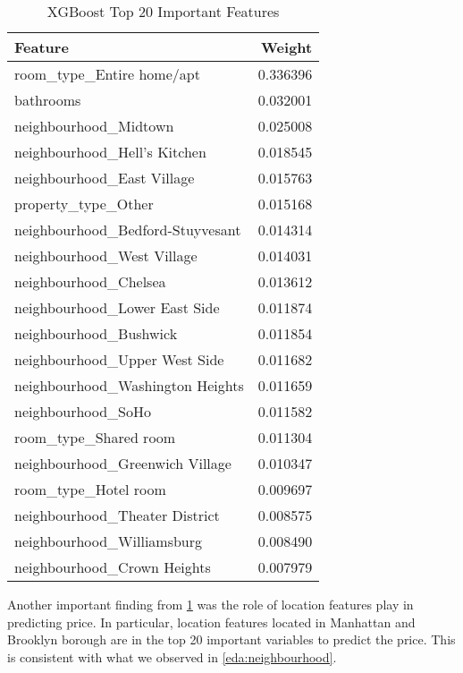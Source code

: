 \begin{table}[!htbp]
  \centering
  \caption{XGBoost Top 20 Important Features}
  \label{tab:xgb-weights}
  \begin{tabular}{lr}
    \toprule
    {Feature} &    Weight \\
    \midrule
    room\_type\_Entire home/apt        &  0.336396 \\
    bathrooms                        &  0.032001 \\
    neighbourhood\_Midtown            &  0.025008 \\
    neighbourhood\_Hell's Kitchen     &  0.018545 \\
    neighbourhood\_East Village       &  0.015763 \\
    property\_type\_Other              &  0.015168 \\
    neighbourhood\_Bedford-Stuyvesant &  0.014314 \\
    neighbourhood\_West Village       &  0.014031 \\
    neighbourhood\_Chelsea            &  0.013612 \\
    neighbourhood\_Lower East Side    &  0.011874 \\
    neighbourhood\_Bushwick           &  0.011854 \\
    neighbourhood\_Upper West Side    &  0.011682 \\
    neighbourhood\_Washington Heights &  0.011659 \\
    neighbourhood\_SoHo               &  0.011582 \\
    room\_type\_Shared room            &  0.011304 \\
    neighbourhood\_Greenwich Village  &  0.010347 \\
    room\_type\_Hotel room             &  0.009697 \\
    neighbourhood\_Theater District   &  0.008575 \\
    neighbourhood\_Williamsburg       &  0.008490 \\
    neighbourhood\_Crown Heights      &  0.007979 \\
  \bottomrule
  \end{tabular}
\end{table}

Another important finding from \ref{tab:xgb-weights} was the role of location
features play in predicting price. In particular, location features located in
Manhattan and Brooklyn borough are in the top 20 important variables to predict
the price. This is consistent with what we observed in \ref{eda:neighbourhood}.
